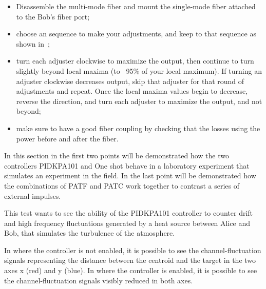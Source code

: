 \begin{itemize}
  \item Disassemble the multi-mode fiber and mount the single-mode fiber attached to the Bob's fiber port;
  \item choose an sequence to make your adjustments, and keep to that sequence as shown in~;
  \item turn each adjuster clockwise to maximize the output, then continue to turn slightly beyond local maxima (to ~95\% of your local maximum). If turning an adjuster clockwise decreases output, skip that adjuster for that round of adjustments and repeat. Once the local maxima values begin to decrease, reverse the direction, and turn each adjuster to maximize the output, and not beyond;
  \item make sure to have a good fiber coupling by checking that the losses using the power before and after the fiber.
\end{itemize}


In this section in the first two points will be demonstrated how the two controllers PIDKPA101 and One shot behave in a laboratory experiment that simulates an experiment in the field.
In the last point will be demonstrated how the combinations of PATF and PATC work together to contrast a series of external impulses.

This test wants to see the ability of the PIDKPA101 controller to counter drift and high frequency fluctuations generated by a heat source between Alice and Bob, that simulates the turbulence of the atmosphere.

In  where the controller is not enabled, it is possible to see the channel-fluctuation signals representing the distance between the centroid and the target in the two axes x (red) and y (blue).
In  where the controller is enabled, it is possible to see the channel-fluctuation signals visibly reduced in both axes.

